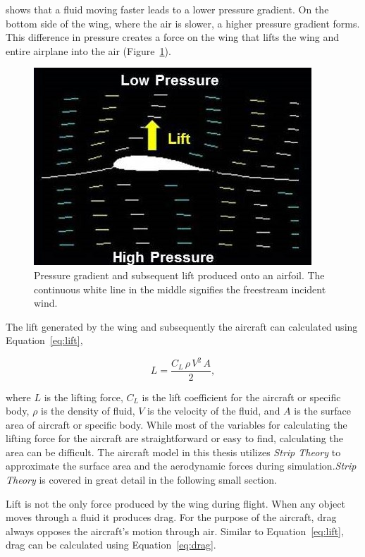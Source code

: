 shows that a fluid moving faster leads to a lower pressure gradient. On the bottom side of the wing, where the air is slower, a higher pressure gradient forms. This difference in pressure creates a force on the wing that lifts the wing and entire airplane into the air (Figure~\ref{fig:pressuregradient}).

\begin{figure}[!ht]\label{fig:pressuregradient}
    \centering
    \includegraphics[width=0.75\linewidth]{Figures/foillift.jpg}
    \caption{Pressure gradient and subsequent lift produced onto an airfoil. The continuous white line in the middle signifies the freestream incident wind.}
\end{figure}

The lift generated by the wing and subsequently the aircraft can calculated using Equation~\ref{eq:lift},

\begin{equation}\label{eq:lift}
    L = \frac{C_L \, \rho \, V^2 \, A}{2},
\end{equation}

where \(L\) is the lifting force, \(C_L\) is the lift coefficient for the aircraft or specific body, \( \rho \) is the density of fluid, \(V\) is the velocity of the fluid, and \(A\) is the surface area of aircraft or specific body. While most of the variables for calculating the lifting force for the aircraft are straightforward or easy to find, calculating the area can be difficult. The aircraft model in this thesis utilizes \textit{Strip Theory} to approximate the surface area and the aerodynamic forces during simulation.\textit{Strip Theory} is covered in great detail in the following small section.

Lift is not the only force produced by the wing during flight. When any object moves through a fluid it produces drag. For the purpose of the aircraft, drag always opposes the aircraft's motion through air. Similar to Equation~\ref{eq:lift}, drag can be calculated using Equation~\ref{eq:drag}.

